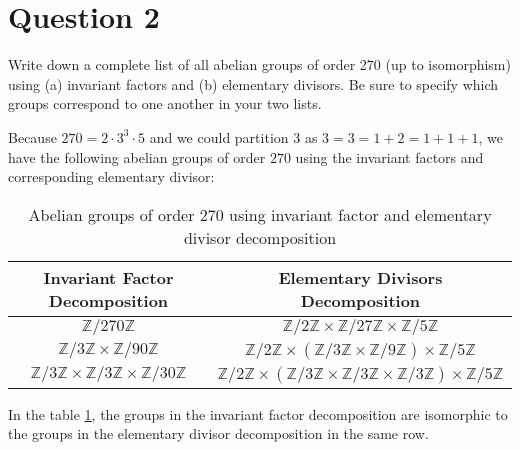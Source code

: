 \section{Question 2}

\begin{question}
    Write down a complete list of all abelian groups of order 270 (up to isomorphism) using (a) invariant factors and (b) elementary divisors. Be sure to specify which groups correspond to one another in your two lists.
\end{question}

\begin{answer}
    Because $270 = 2\cdot3^3\cdot5$ and we could partition $3$ as $3 = 3 = 1+2 = 1+1+1$, we have the following abelian groups of order $270$ using the invariant factors and corresponding elementary divisor:
    \begin{table}[H]
        \centering
            \begin{tabular}{|c|c|}
                \hline
                Invariant Factor Decomposition                                                      & Elementary Divisors Decomposition                                                                                                                \\ \hline
                $\mathbb{Z}/270\mathbb{Z}$                                                          & $\mathbb{Z}/2\mathbb{Z} \times \mathbb{Z}/27\mathbb{Z} \times \mathbb{Z}/5\mathbb{Z}$                                                            \\ \hline
                $\mathbb{Z}/3\mathbb{Z}\times\mathbb{Z}/90\mathbb{Z}$                               & $\mathbb{Z}/2\mathbb{Z} \times (\mathbb{Z}/3\mathbb{Z}\times\mathbb{Z}/9\mathbb{Z}) \times \mathbb{Z}/5\mathbb{Z}$                               \\ \hline
                $\mathbb{Z}/3\mathbb{Z} \times \mathbb{Z}/3\mathbb{Z}\times\mathbb{Z}/30\mathbb{Z}$ & $\mathbb{Z}/2\mathbb{Z} \times (\mathbb{Z}/3\mathbb{Z}\times\mathbb{Z}/3\mathbb{Z} \times \mathbb{Z}/3\mathbb{Z}) \times \mathbb{Z}/5\mathbb{Z}$ \\ \hline
            \end{tabular}
        \caption{Abelian groups of order $270$ using invariant factor and elementary divisor decomposition}
        \label{tab:tab1}
    \end{table}
    In the table \ref{tab:tab1}, the groups in the invariant factor decomposition are isomorphic to the groups in the elementary divisor decomposition in the same row.
\end{answer}